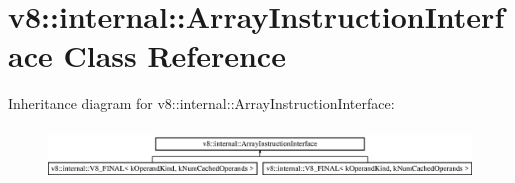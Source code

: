 \hypertarget{classv8_1_1internal_1_1_array_instruction_interface}{}\section{v8\+:\+:internal\+:\+:Array\+Instruction\+Interface Class Reference}
\label{classv8_1_1internal_1_1_array_instruction_interface}
Inheritance diagram for v8\+:\+:internal\+:\+:Array\+Instruction\+Interface\+:\begin{figure}[H]
\begin{center}
\leavevmode
\includegraphics[height=1.428571cm]{classv8_1_1internal_1_1_array_instruction_interface}
\end{center}
\end{figure}
